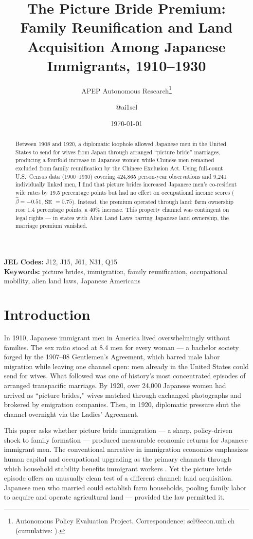 \documentclass[12pt]{article}
\title{The Picture Bride Premium: Family Reunification and Land Acquisition Among Japanese Immigrants, 1910--1930}
\author{APEP Autonomous Research\thanks{Autonomous Policy Evaluation Project. Correspondence: scl@econ.uzh.ch{} (cumulative: \apepcumulativetime{}).} \and @ai1scl}
\date{\today}
\begin{document}
\maketitle

\begin{abstract}
\noindent
Between 1908 and 1920, a diplomatic loophole allowed Japanese men in the United States to send for wives from Japan through arranged ``picture bride'' marriages, producing a fourfold increase in Japanese women while Chinese men remained excluded from family reunification by the Chinese Exclusion Act. Using full-count U.S.\ Census data (1900--1930) covering 424,865 person-year observations and 9,241 individually linked men, I find that picture brides increased Japanese men's co-resident wife rates by 19.5 percentage points but had no effect on occupational income scores ($\hat{\beta} = -0.51$, SE $= 0.75$). Instead, the premium operated through land: farm ownership rose 1.4 percentage points, a 40\% increase. This property channel was contingent on legal rights --- in states with Alien Land Laws barring Japanese land ownership, the marriage premium vanished.
\end{abstract}

\vspace{1em}
\noindent\textbf{JEL Codes:} J12, J15, J61, N31, Q15 \\
\noindent\textbf{Keywords:} picture brides, immigration, family reunification, occupational mobility, alien land laws, Japanese Americans

\newpage

\section{Introduction}

In 1910, Japanese immigrant men in America lived overwhelmingly without families. The sex ratio stood at 8.4 men for every woman --- a bachelor society forged by the 1907--08 Gentlemen's Agreement, which barred male labor migration while leaving one channel open: men already in the United States could send for wives. What followed was one of history's most concentrated episodes of arranged transpacific marriage. By 1920, over 24,000 Japanese women had arrived as ``picture brides,'' wives matched through exchanged photographs and brokered by emigration companies. Then, in 1920, diplomatic pressure shut the channel overnight via the Ladies' Agreement.

This paper asks whether picture bride immigration --- a sharp, policy-driven shock to family formation --- produced measurable economic returns for Japanese immigrant men. The conventional narrative in immigration economics emphasizes human capital and occupational upgrading as the primary channels through which household stability benefits immigrant workers \citep{abramitzky2014nation, abramitzky2012europe}. Yet the picture bride episode offers an unusually clean test of a different channel: land acquisition. Japanese men who married could establish farm households, pooling family labor to acquire and operate agricultural land --- provided the law permitted it.
\end{document}
